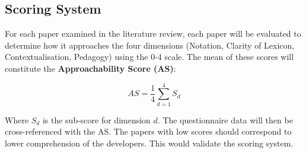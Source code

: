 \subsection{Scoring System}

For each paper examined in the literature review, each paper will be evaluated to determine how it approaches the four dimensions (Notation, Clarity of Lexicon, Contextualisation, Pedagogy)
using the 0-4 scale. The mean of these scores will constitute the \textbf{Approachability Score (AS)}:

\begin{equation}
    AS = \frac{1}{4} \sum_{d=1}^{4} S_d
\end{equation}

Where $S_d$ is the sub-score for dimension $d$.
The questionnaire data will then be cross-referenced with the AS. The papers with low scores should correspond to lower comprehension of the developers. This would validate the scoring system.
